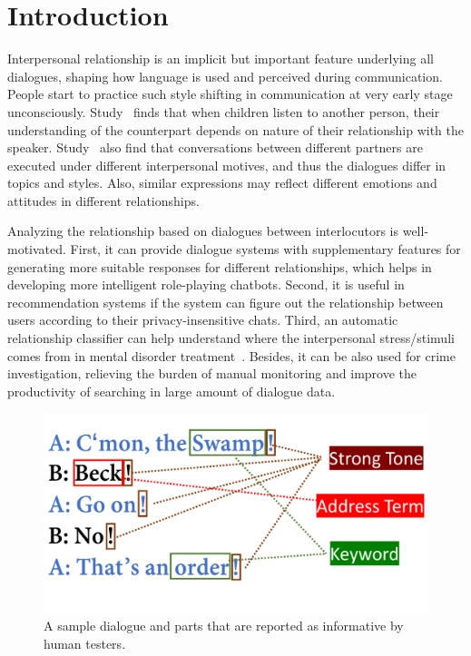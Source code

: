 \section{Introduction}

Interpersonal relationship is an implicit but important feature 
underlying all dialogues, shaping how language is used and perceived 
during communication. People start to practice such style shifting in 
communication at very early stage unconsciously. Study~\cite{mind-reading} 
finds that when children listen to another person, their understanding 
of the counterpart depends on nature of their relationship with the speaker. 
Study~\cite{conversational-motive} also find that conversations between 
different partners are executed under different interpersonal motives, 
and thus the dialogues differ in topics and styles. 
Also, similar expressions may reflect different emotions and attitudes in 
different relationships. 

Analyzing the relationship based on dialogues between interlocutors 
is well-motivated. First, it can provide dialogue systems with 
supplementary features for generating more suitable responses for different 
relationships, which helps in developing more intelligent role-playing chatbots.
Second, it is useful in recommendation systems if the system can figure 
out the relationship between users according to their privacy-insensitive chats.
Third, an automatic relationship classifier can help 
understand where the interpersonal stress/stimuli comes from in 
mental disorder treatment~\cite{tension-monitor,bopolar-monitor,cog-load}.
Besides, it can be also used for crime investigation, relieving
the burden of manual monitoring and improve the productivity of searching
in large amount of dialogue data. 

\begin{figure}[t!]
	\centering
	\includegraphics[width=0.85\columnwidth]{instinct.pdf}
	\caption{A sample dialogue and parts that are 
		reported as informative by human testers. }
	\label{fig:instinct}
\end{figure}

